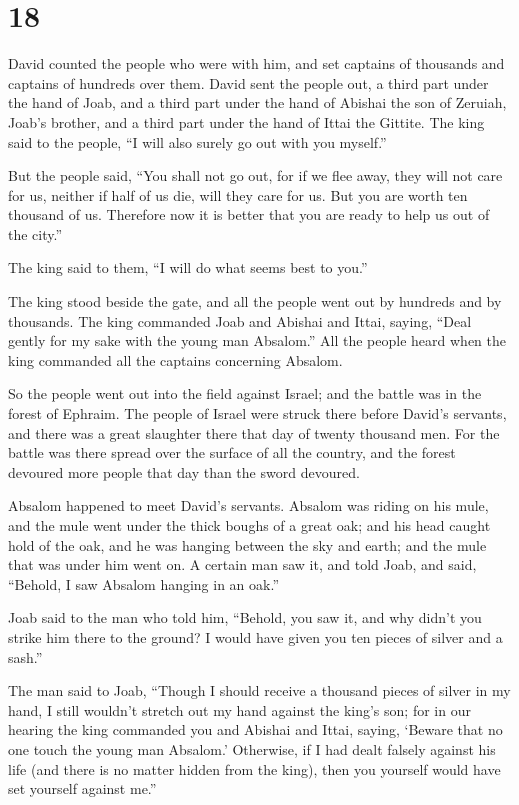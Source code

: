 \hypertarget{section-17}{%
\section{18}\label{section-17}}

 David counted the people who were with him, and set
captains of thousands and captains of hundreds over them. 
David sent the people out, a third part under the hand of Joab, and a
third part under the hand of Abishai the son of Zeruiah, Joab's brother,
and a third part under the hand of Ittai the Gittite. The king said to
the people, ``I will also surely go out with you myself.''

 But the people said, ``You shall not go out, for if we
flee away, they will not care for us, neither if half of us die, will
they care for us. But you are worth ten thousand of us. Therefore now it
is better that you are ready to help us out of the city.''

 The king said to them, ``I will do what seems best to
you.''

The king stood beside the gate, and all the people went out by hundreds
and by thousands.  The king commanded Joab and Abishai and
Ittai, saying, ``Deal gently for my sake with the young man Absalom.''
All the people heard when the king commanded all the captains concerning
Absalom.

 So the people went out into the field against Israel; and
the battle was in the forest of Ephraim.  The people of
Israel were struck there before David's servants, and there was a great
slaughter there that day of twenty thousand men.  For the
battle was there spread over the surface of all the country, and the
forest devoured more people that day than the sword devoured.

 Absalom happened to meet David's servants. Absalom was
riding on his mule, and the mule went under the thick boughs of a great
oak; and his head caught hold of the oak, and he was hanging between the
sky and earth; and the mule that was under him went on. 
A certain man saw it, and told Joab, and said, ``Behold, I saw Absalom
hanging in an oak.''

 Joab said to the man who told him, ``Behold, you saw it,
and why didn't you strike him there to the ground? I would have given
you ten pieces of silver and a sash.''

 The man said to Joab, ``Though I should receive a
thousand pieces of silver in my hand, I still wouldn't stretch out my
hand against the king's son; for in our hearing the king commanded you
and Abishai and Ittai, saying, `Beware that no one touch the young man
Absalom.'  Otherwise, if I had dealt falsely against his
life (and there is no matter hidden from the king), then you yourself
would have set yourself against me.''

